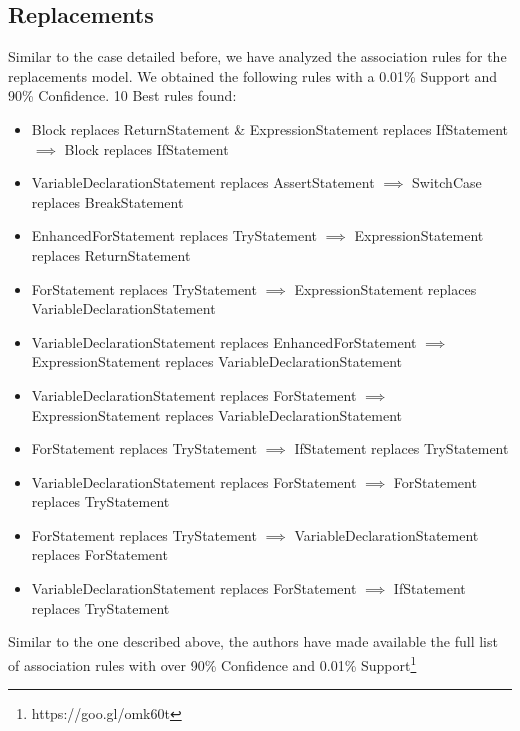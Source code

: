 \documentclass[conference]{IEEEtran}
\begin{document}
\subsection{Replacements}

Similar to the case detailed before, we have analyzed the association rules for the replacements model. We obtained the following rules with a 0.01\% Support and 90\% Confidence.
10 Best rules found:
\begin{itemize}
\item Block replaces ReturnStatement \& ExpressionStatement replaces IfStatement $\implies$ Block replaces IfStatement
\item VariableDeclarationStatement replaces AssertStatement $\implies$ SwitchCase replaces BreakStatement
\item EnhancedForStatement replaces TryStatement $\implies$ ExpressionStatement replaces ReturnStatement
\item ForStatement replaces TryStatement $\implies$ ExpressionStatement replaces VariableDeclarationStatement
\item VariableDeclarationStatement replaces EnhancedForStatement $\implies$ ExpressionStatement replaces VariableDeclarationStatement
\item VariableDeclarationStatement replaces ForStatement $\implies$ ExpressionStatement replaces VariableDeclarationStatement
\item ForStatement replaces TryStatement $\implies$ IfStatement replaces TryStatement
\item VariableDeclarationStatement replaces ForStatement $\implies$ ForStatement replaces TryStatement
\item ForStatement replaces TryStatement $\implies$ VariableDeclarationStatement replaces ForStatement
\item VariableDeclarationStatement replaces ForStatement $\implies$ IfStatement replaces TryStatement
\end{itemize}

Similar to the one described above, the authors have made available the full list of association rules with over 90\% Confidence and 0.01\% Support\footnote{https://goo.gl/omk60t}



\end{document}

